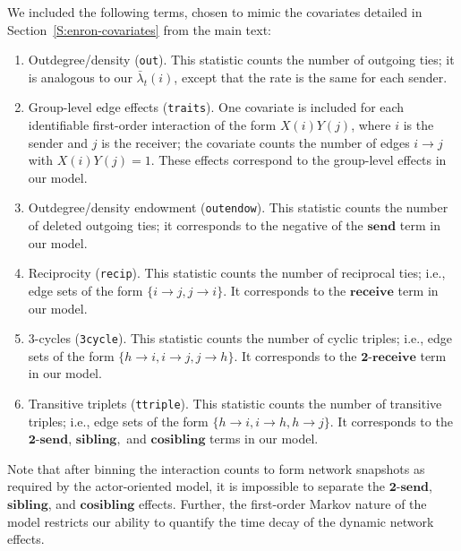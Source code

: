 \documentclass[final]{statsoc}
\begin{document}
We included the following terms, chosen to mimic the covariates detailed in Section~\ref{S:enron-covariates} from the main text:

\begin{enumerate}
  \item Outdegree/density (\texttt{out}). This statistic counts the number
of outgoing ties; it is analogous to our $\bar \lambda_t(i)$, except that
the rate is the same for each sender.

  \item Group-level edge effects (\texttt{traits}).  One covariate is included for each
identifiable first-order interaction of the form $X(i) Y(j)$, where $i$ is the
sender and $j$ is the receiver; the covariate counts the number of edges $i
\to j$ with $X(i) Y(j) = 1$.  These effects correspond to the group-level
effects in our model.

  \item Outdegree/density endowment (\texttt{outendow}).  This statistic counts the number of deleted outgoing ties; it corresponds to the
negative of the $\textbf{send}$ term in our model.

  \item Reciprocity (\texttt{recip}).  This statistic counts the number of
    reciprocal ties; i.e., edge sets of the form $\{ i \to j, j \to i \}$.  It
corresponds to the $\textbf{receive}$ term in our model.

  \item 3-cycles (\texttt{3cycle}).  This statistic counts the number of cyclic
triples; i.e., edge sets of the form $\{ h \to i, i \to j, j \to h\}$.  It
corresponds to the $\textbf{2-receive}$ term in our model.

  \item Transitive triplets (\texttt{ttriple}).  This statistic counts the
number of transitive triples; i.e., edge sets of the form $\{ h \to i, i \to h, h
\to j \}$.  It corresponds to the $\textbf{2-send}$, $\textbf{sibling},$
and $\textbf{cosibling}$ terms in our model.

\end{enumerate}

\noindent
Note that after binning the interaction counts to form network snapshots as
required by the actor-oriented model, it is impossible to separate the
$\textbf{2-send}$, $\textbf{sibling}$, and $\textbf{cosibling}$ effects.
Further, the first-order Markov nature of the model restricts
our ability to quantify the time decay of the dynamic network effects.
\end{document}
